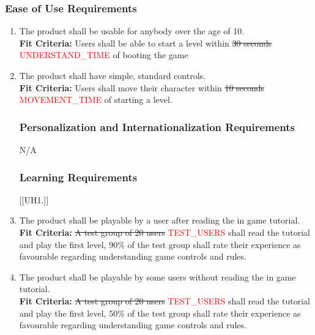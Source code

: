 \documentclass[12pt, titlepage]{article}
\begin{document}
\subsubsection{Ease of Use Requirements}
\begin{enumerate}[{UH}1. ]
    \item The product shall be usable for anybody over the age of 10.\\
    \textbf{Fit Criteria:} Users shall be able to start a level within \sout{30 seconds} \textcolor{red}{UNDERSTAND\_TIME} of booting the game
    \item The product shall have simple, standard controls.\\
    \textbf{Fit Criteria:} Users shall move their character within \sout{10 seconds} \textcolor{red}{MOVEMENT\_TIME} of starting a level.

\subsubsection{Personalization and Internationalization Requirements}
N/A

\subsubsection{Learning Requirements}
[{[{UH}1.]}]
    \item The product shall be playable by a user after reading the in game tutorial.\\
    \textbf{Fit Criteria:} \sout{A test group of 20 users} \textcolor{red}{TEST\_USERS} shall read the tutorial and play the first level, $90$\% of the test group shall rate their experience as favourable regarding understanding game controls and rules.
    \item The product shall be playable by some users without reading the in game tutorial.\\
    \textbf{Fit Criteria:} \sout{A test group of 20 users} \textcolor{red}{TEST\_USERS} shall read the tutorial and play the first level, $50$\% of the test group shall rate their experience as favourable regarding understanding game controls and rules.


\end{enumerate}
\end{document}
